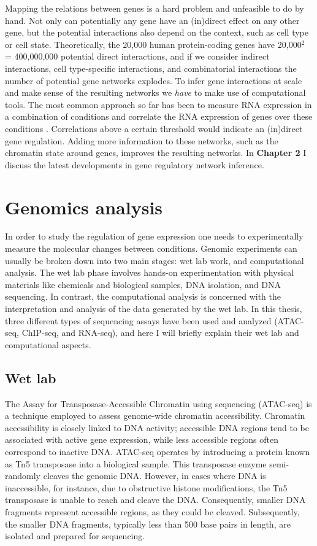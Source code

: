 Mapping the relations between genes is a hard problem and unfeasible to do by hand. Not only can potentially any gene have an (in)direct effect on any other gene, but the potential interactions also depend on the context, such as cell type or cell state. Theoretically, the 20,000 human protein-coding genes have 20,000$^2$ = 400,000,000 potential direct interactions, and if we consider indirect interactions, cell type-specific interactions, and combinatorial interactions the number of potential gene networks explodes. To infer gene interactions at scale and make sense of the resulting networks we \textit{have} to make use of computational tools. The most common approach so far has been to measure RNA expression in a combination of conditions and correlate the RNA expression of genes over these conditions \cite{Zhang_2005,Margolin_2006}. Correlations above a certain threshold would indicate an (in)direct gene regulation. Adding more information to these networks, such as the chromatin state around genes\cite{Xu_2020,Kamal_2021}, improves the resulting networks. In \textbf{Chapter 2} I discuss the latest developments in gene regulatory network inference.

\section{Genomics analysis}

In order to study the regulation of gene expression one needs to experimentally measure the molecular changes between conditions. Genomic experiments can usually be broken down into two main stages: wet lab work,  and computational analysis. The wet lab phase involves hands-on experimentation with physical materials like chemicals and biological samples, DNA isolation, and DNA sequencing. In contrast, the computational analysis is concerned with the interpretation and analysis of the data generated by the wet lab.  In this thesis, three different types of sequencing assays have been used and analyzed (ATAC-seq, ChIP-seq, and RNA-seq), and here I will briefly explain their wet lab and computational aspects. 

\subsection{Wet lab}

The Assay for Transposase-Accessible Chromatin using sequencing (ATAC-seq) is a technique employed to assess genome-wide chromatin accessibility\cite{Buenrostro_2015}. Chromatin accessibility is closely linked to DNA activity; accessible DNA regions tend to be associated with active gene expression, while less accessible regions often correspond to inactive DNA. ATAC-seq operates by introducing a protein known as Tn5 transposase into a biological sample. This transposase enzyme semi-randomly cleaves the genomic DNA. However, in cases where DNA is inaccessible, for instance, due to obstructive histone modifications, the Tn5 transposase is unable to reach and cleave the DNA. Consequently, smaller DNA fragments represent accessible regions, as they could be cleaved. Subsequently, the smaller DNA fragments, typically less than 500 base pairs in length, are isolated and prepared for sequencing.

